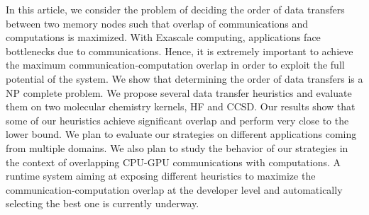 \documentclass[runningheads]{llncs} %
\begin{document}
		In this article, we consider the problem of deciding the order of data transfers between two memory nodes such that overlap of communications and computations is maximized. With Exascale computing, applications face bottlenecks due to communications. Hence, it is extremely important to achieve the maximum  communication-computation overlap in order to exploit the full potential of the system. We show that determining the order of data transfers is a NP complete problem. We propose several data transfer heuristics and evaluate them on two molecular chemistry kernels, HF and CCSD. Our results show that some of our heuristics achieve significant overlap and perform very close to the lower bound. We plan to evaluate our strategies on different applications coming from multiple domains. We also plan to study the behavior of our strategies in the context of overlapping CPU-GPU communications with computations. A runtime system aiming at exposing different heuristics to maximize the communication-computation overlap at the developer level and automatically selecting the best one is currently underway.






\end{document}
